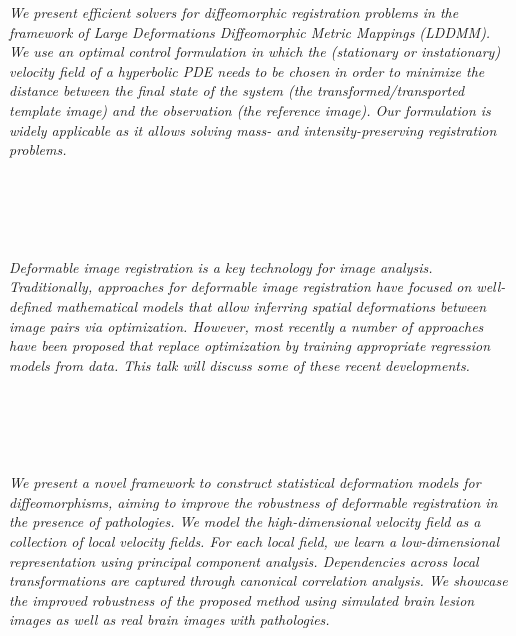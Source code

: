   \begin{multicols}{2}
      \textit{We present efficient solvers for diffeomorphic registration problems in the framework of Large Deformations Diffeomorphic Metric Mappings (LDDMM). We use an optimal control formulation in which the (stationary or instationary) velocity field of a hyperbolic PDE needs to be chosen in order to minimize the distance between the final state of the system (the transformed/transported template image) and the observation (the reference image). Our formulation is widely applicable as it allows solving mass- and intensity-preserving registration problems.}\\
\\ 
        \\
        \\\\
\\
      \textit{Deformable image registration is a key technology for image analysis. Traditionally, approaches for deformable image registration have focused on well-defined mathematical models that allow inferring spatial deformations between image pairs via optimization. However, most recently a number of approaches have been proposed that replace optimization by training appropriate regression models from data. This talk will discuss some of these recent developments.}\\
\\ 
        \\
        \\\\
\\
      \textit{We present a novel framework to construct statistical deformation models for diffeomorphisms, aiming to improve the robustness of deformable registration in the presence of pathologies. We model the high-dimensional velocity field as a collection of local velocity fields. For each local field, we learn a low-dimensional representation using principal component analysis. Dependencies across local transformations are captured through canonical correlation analysis. We showcase the improved robustness of the proposed method using simulated brain lesion images as well as real brain images with pathologies.}\\
\\ 
        \\
        \\\\

\end{multicols}
